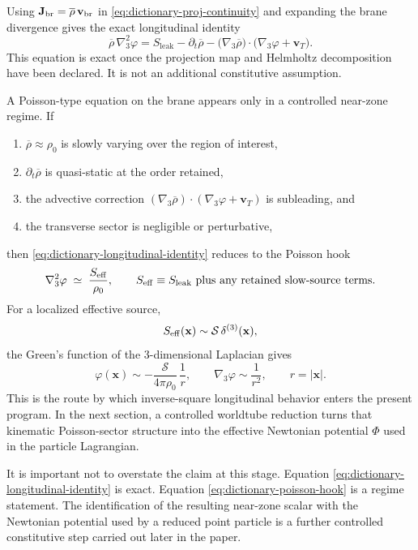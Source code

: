 \documentclass[11pt]{article}
\newcommand{\x}{\mathbf x}
\newcommand{\gradThree}{\nabla_3}
\newcommand{\lapThree}{\nabla_3^2}
\newcommand{\Proj}[1]{\overline{#1}}
\newcommand{\PhiN}{\Phi}
\newcommand{\phibr}{\varphi}
\newcommand{\Sleak}{S_{\mathrm{leak}}}
\begin{document}
Using \(\mathbf{J}_{\rm br}=\Proj{\rho}\,\mathbf{v}_{\rm br}\) in
\eqref{eq:dictionary-proj-continuity} and expanding the brane divergence gives the exact
longitudinal identity
\begin{equation}
\boxed{
\Proj{\rho}\,\lapThree \phibr
=
\Sleak
-
\partial_t\Proj{\rho}
-
\bigl(\gradThree \Proj{\rho}\bigr)\!\cdot\!\bigl(\gradThree\phibr+\mathbf{v}_T\bigr).
}
\label{eq:dictionary-longitudinal-identity}
\end{equation}
This equation is exact once the projection map and Helmholtz decomposition have been
declared. It is not an additional constitutive assumption.

A Poisson-type equation on the brane appears only in a controlled near-zone regime. If
\begin{enumerate}[leftmargin=1.5em]
  \item \(\Proj{\rho}\approx \rho_0\) is slowly varying over the region of interest,
  \item \(\partial_t\Proj{\rho}\) is quasi-static at the order retained,
  \item the advective correction \((\gradThree \Proj{\rho})\!\cdot\!(\gradThree\phibr+\mathbf{v}_T)\) is subleading, and
  \item the transverse sector is negligible or perturbative,
\end{enumerate}
then \eqref{eq:dictionary-longitudinal-identity} reduces to the Poisson hook
\begin{equation}
\lapThree \phibr
\;\simeq\;
\frac{S_{\rm eff}}{\rho_0},
\qquad
S_{\rm eff}\equiv \Sleak\ \text{plus any retained slow-source terms}.
\label{eq:dictionary-poisson-hook}
\end{equation}
For a localized effective source,
\begin{equation}
S_{\rm eff}(\x)\sim \mathcal S\,\delta^{(3)}(\x),
\end{equation}
the Green's function of the \(3\)-dimensional Laplacian gives
\begin{equation}
\phibr(\x)\sim -\frac{\mathcal S}{4\pi\rho_0}\,\frac{1}{r},
\qquad
\gradThree\phibr \sim \frac{1}{r^2},
\qquad
r=|\x|.
\label{eq:dictionary-inverse-square}
\end{equation}
This is the route by which inverse-square longitudinal behavior enters the present
program. In the next section, a controlled worldtube reduction turns that kinematic
Poisson-sector structure into the effective Newtonian potential \(\PhiN\) used in the
particle Lagrangian.

It is important not to overstate the claim at this stage. Equation
\eqref{eq:dictionary-longitudinal-identity} is exact. Equation
\eqref{eq:dictionary-poisson-hook} is a regime statement. The identification of the
resulting near-zone scalar with the Newtonian potential used by a reduced point particle
is a further controlled constitutive step carried out later in the paper.
\end{document}
